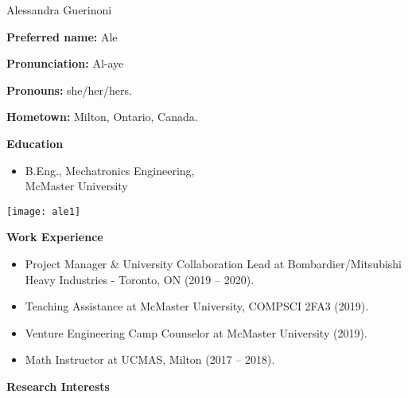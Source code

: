 \documentclass[12pt,fleqn]{article}
\newcommand{\bi}{\begin{itemize}}
\newcommand{\ei}{\end{itemize}}
\begin{document}
\noindent
\begin{minipage}[t]{63ex}
\noindent
{\huge \sf Alessandra Guerinoni}

\vspace{3ex}

\noindent
\textbf{Preferred name:} Ale

\vspace{1.5ex}

\noindent
\textbf{Pronunciation:} Al-aye

\vspace{1.5ex}

\noindent
\textbf{Pronouns:} she/her/hers.

\vspace{1.5ex}

\noindent
\textbf{Hometown:} Milton, Ontario, Canada. 

\vspace{1.5ex}

\noindent
\textbf{Education}

\vspace{-1.5ex}

\bi

  \item B.Eng., Mechatronics Engineering,
  \\ McMaster University


\ei
\end{minipage}
\hfill
\begin{minipage}[t]{35ex}
  \vspace{-3.5ex}
  \texttt{[image: ale1]}
\end{minipage}

\bigskip

\noindent
\textbf{Work Experience}

\bi

  \item Project Manager \& University Collaboration Lead at Bombardier/Mitsubishi Heavy Industries - Toronto, ON (2019 -- 2020).

  \item Teaching Assistance at McMaster University, COMPSCI 2FA3 (2019).

  \item Venture Engineering Camp Counselor at McMaster University (2019).

  \item Math Instructor at UCMAS, Milton (2017 -- 2018).

\ei

\noindent
\textbf{Research Interests}
\end{document}
